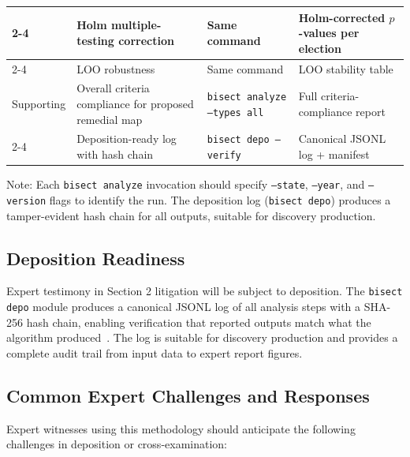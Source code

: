 \begin{table}[h]
\begin{threeparttable}
\begin{tabular}{p{1cm}p{3.5cm}p{4cm}p{3.5cm}}
\cmidrule{2-4}
  & Holm multiple-testing correction &
  Same command &
  Holm-corrected $p$-values per election \\
\cmidrule{2-4}
  & LOO robustness &
  Same command &
  LOO stability table \\
\midrule
Supporting &
  Overall criteria compliance for proposed remedial map &
  \texttt{bisect analyze --types all} &
  Full criteria-compliance report \\
\cmidrule{2-4}
  & Deposition-ready log with hash chain &
  \texttt{bisect depo --verify} &
  Canonical JSONL log + manifest \\
\bottomrule
\end{tabular}
\begin{tablenotes}
\small
\item Note: Each \texttt{bisect analyze} invocation should specify
  \texttt{--state}, \texttt{--year}, and \texttt{--version} flags to
  identify the run.  The deposition log (\texttt{bisect depo}) produces
  a tamper-evident hash chain for all outputs, suitable for discovery
  production.
\end{tablenotes}
\end{threeparttable}
\end{table}

\subsection{Deposition Readiness}

Expert testimony in Section 2 litigation will be subject to deposition.
The \texttt{bisect depo} module produces a canonical JSONL log of all
analysis steps with a SHA-256 hash chain, enabling verification that
reported outputs match what the algorithm produced~\citep{dellaLibera2026vra}.
The log is suitable for discovery production and provides a complete
audit trail from input data to expert report figures.

\subsection{Common Expert Challenges and Responses}

Expert witnesses using this methodology should anticipate the following
challenges in deposition or cross-examination:

